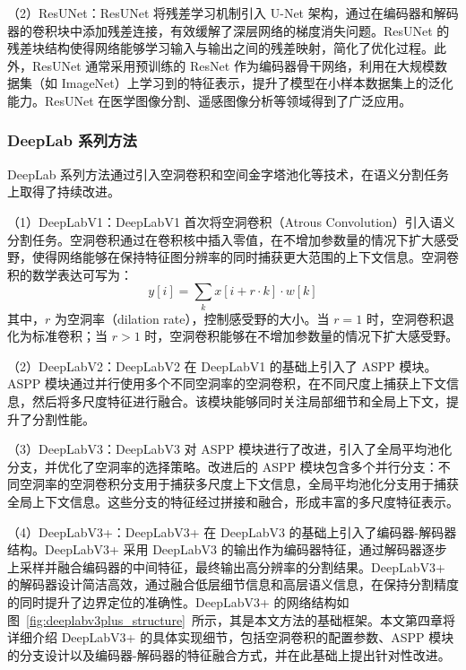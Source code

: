（2）ResUNet：ResUNet 将残差学习机制引入 U-Net 架构，通过在编码器和解码器的卷积块中添加残差连接，有效缓解了深层网络的梯度消失问题。ResUNet 的残差块结构使得网络能够学习输入与输出之间的残差映射，简化了优化过程。此外，ResUNet 通常采用预训练的 ResNet 作为编码器骨干网络，利用在大规模数据集（如 ImageNet）上学习到的特征表示，提升了模型在小样本数据集上的泛化能力。ResUNet 在医学图像分割、遥感图像分析等领域得到了广泛应用。

\subsubsection{DeepLab 系列方法}

DeepLab 系列方法通过引入空洞卷积和空间金字塔池化等技术，在语义分割任务上取得了持续改进。

（1）DeepLabV1：DeepLabV1 首次将空洞卷积（Atrous Convolution）引入语义分割任务。空洞卷积通过在卷积核中插入零值，在不增加参数量的情况下扩大感受野，使得网络能够在保持特征图分辨率的同时捕获更大范围的上下文信息。空洞卷积的数学表达可写为：
\begin{equation}
y[i] = \sum_{k} x[i + r \cdot k] \cdot w[k]
\label{eq:atrous_conv}
\end{equation}
其中，$r$ 为空洞率（dilation rate），控制感受野的大小。当 $r=1$ 时，空洞卷积退化为标准卷积；当 $r>1$ 时，空洞卷积能够在不增加参数量的情况下扩大感受野。

（2）DeepLabV2：DeepLabV2 在 DeepLabV1 的基础上引入了 ASPP 模块。ASPP 模块通过并行使用多个不同空洞率的空洞卷积，在不同尺度上捕获上下文信息，然后将多尺度特征进行融合。该模块能够同时关注局部细节和全局上下文，提升了分割性能。

（3）DeepLabV3：DeepLabV3 对 ASPP 模块进行了改进，引入了全局平均池化分支，并优化了空洞率的选择策略。改进后的 ASPP 模块包含多个并行分支：不同空洞率的空洞卷积分支用于捕获多尺度上下文信息，全局平均池化分支用于捕获全局上下文信息。这些分支的特征经过拼接和融合，形成丰富的多尺度特征表示。

（4）DeepLabV3+：DeepLabV3+ 在 DeepLabV3 的基础上引入了编码器-解码器结构。DeepLabV3+ 采用 DeepLabV3 的输出作为编码器特征，通过解码器逐步上采样并融合编码器的中间特征，最终输出高分辨率的分割结果。DeepLabV3+ 的解码器设计简洁高效，通过融合低层细节信息和高层语义信息，在保持分割精度的同时提升了边界定位的准确性。DeepLabV3+ 的网络结构如图~\ref{fig:deeplabv3plus_structure}~所示，其是本文方法的基础框架。本文第四章将详细介绍 DeepLabV3+ 的具体实现细节，包括空洞卷积的配置参数、ASPP 模块的分支设计以及编码器-解码器的特征融合方式，并在此基础上提出针对性改进。


